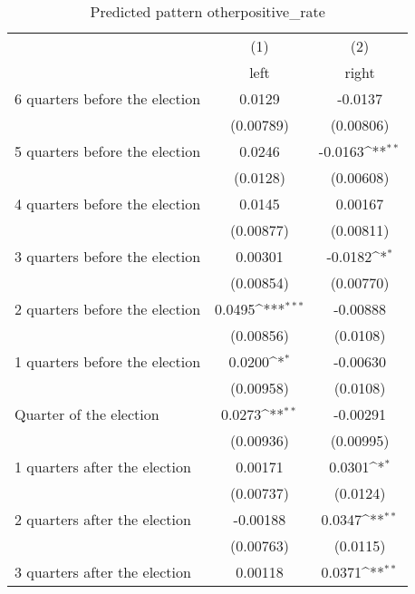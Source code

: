 \begin{table}[htbp]\centering
\def\sym#1{\ifmmode^{#1}\else\(^{#1}\)\fi}
\caption{Predicted pattern otherpositive\_rate}
\begin{tabular}{l*{2}{c}}
\hline\hline
                    &\multicolumn{1}{c}{(1)}&\multicolumn{1}{c}{(2)}\\
                    &\multicolumn{1}{c}{left}&\multicolumn{1}{c}{right}\\
\hline
 6 quarters before the election&      0.0129         &     -0.0137         \\
                    &   (0.00789)         &   (0.00806)         \\
[1em]
 5 quarters before the election&      0.0246         &     -0.0163\sym{**} \\
                    &    (0.0128)         &   (0.00608)         \\
[1em]
 4 quarters before the election&      0.0145         &     0.00167         \\
                    &   (0.00877)         &   (0.00811)         \\
[1em]
 3 quarters before the election&     0.00301         &     -0.0182\sym{*}  \\
                    &   (0.00854)         &   (0.00770)         \\
[1em]
 2 quarters before the election&      0.0495\sym{***}&    -0.00888         \\
                    &   (0.00856)         &    (0.0108)         \\
[1em]
 1 quarters before the election&      0.0200\sym{*}  &    -0.00630         \\
                    &   (0.00958)         &    (0.0108)         \\
[1em]
Quarter of the election&      0.0273\sym{**} &    -0.00291         \\
                    &   (0.00936)         &   (0.00995)         \\
[1em]
 1 quarters after the election&     0.00171         &      0.0301\sym{*}  \\
                    &   (0.00737)         &    (0.0124)         \\
[1em]
 2 quarters after the election&    -0.00188         &      0.0347\sym{**} \\
                    &   (0.00763)         &    (0.0115)         \\
[1em]
 3 quarters after the election&     0.00118         &      0.0371\sym{**} \\

\end{tabular}
\end{table}
